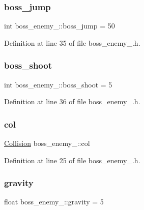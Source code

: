 \subsubsection{\texorpdfstring{boss\+\_\+jump}{boss\_jump}}
{\footnotesize\ttfamily int boss\+\_\+enemy\+\_\+::boss\+\_\+jump = 50}



Definition at line 35 of file boss\+\_\+enemy\+\_.\+h.

\hypertarget{classboss__enemy__2_ad07f609155076e0ee1fd0dcb015e05d0}{}\label{classboss__enemy__2_ad07f609155076e0ee1fd0dcb015e05d0} 
\subsubsection{\texorpdfstring{boss\+\_\+shoot}{boss\_shoot}}
{\footnotesize\ttfamily int boss\+\_\+enemy\+\_\+::boss\+\_\+shoot = 5}



Definition at line 36 of file boss\+\_\+enemy\+\_.\+h.

\hypertarget{classboss__enemy__2_a59f86459a90bbd1ad535889e9197cb6f}{}\label{classboss__enemy__2_a59f86459a90bbd1ad535889e9197cb6f} 
\subsubsection{\texorpdfstring{col}{col}}
{\footnotesize\ttfamily \hyperlink{class_collision}{Collision} boss\+\_\+enemy\+\_\+::col}



Definition at line 25 of file boss\+\_\+enemy\+\_.\+h.

\hypertarget{classboss__enemy__2_a8abff95ac6b01b5d6b38f93f1c4060f7}{}\label{classboss__enemy__2_a8abff95ac6b01b5d6b38f93f1c4060f7} 
\subsubsection{\texorpdfstring{gravity}{gravity}}
{\footnotesize\ttfamily float boss\+\_\+enemy\+\_\+::gravity = 5}



